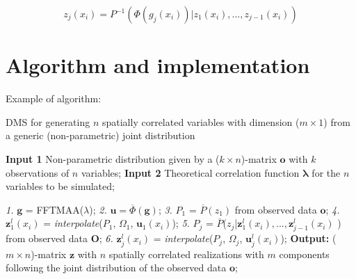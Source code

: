 \documentclass[a4paper,fleqn]{cas-sc}
\begin{document}
\begin{equation} 
\label{eqn:sampling_from_inverse_cumulative_2}
    z_j(x_i) = P^{-1}( \Phi( g_j(x_i) )|z_1(x_i),...,z_{j-1}(x_i))
\end{equation}

\section{Algorithm and implementation}

Example of algorithm:
\begin{algorithm}
  \caption{DMS for generating $n$ spatially correlated variables with dimension ($m\times1$) from a generic (non-parametric) joint distribution }
  
  \begin{algorithmic}
  \label{alg:integrado}
  \State \textbf{Input 1} Non-parametric distribution given by a ($k \times n$)-matrix $\boldsymbol{o}$ with $k$ observations of $n$ variables;
  \State \textbf{Input 2} Theoretical correlation function $\boldsymbol{\lambda}$ for the $n$ variables to be simulated;
  \newline
  
 
 \Statex \textit{1.} $\boldsymbol{g}$ = FFTMAA($\lambda$); 
  \Statex \textit{2.} $\boldsymbol{u} = \overline{\Phi}(\boldsymbol{g})$;
 \State \textit{3.}  $P_1$ = $\overline{P}(z_{1})$ from observed data $\boldsymbol{o}$;
  \newline
   \State \textit{4.} $\boldsymbol{z}_{1}^l(x_i)$ = \textit{interpolate}($P_1$, $\Omega_1$, $\boldsymbol{u}_{1}(x_i)$);
   \State \textit{5.}  $P_j$ = $\overline{P}$($z_j$|$\boldsymbol{z}_{1}^{l}(x_i),...,\boldsymbol{z}_{j-1}^{l}(x_i)$ ) from observed data $\boldsymbol{O}$; 
   \State \textit{6.} $\boldsymbol{z}_{j}^{l}(x_i)$ = \textit{interpolate}($P_j$, $\Omega_j$, $\boldsymbol{u}_{j}^l(x_i)$); 
  \EndFor
  \EndFor 
  \newline
\State  \textbf{Output:} ($m \times n$)-matrix $\boldsymbol{z}$ with $n$ spatially correlated realizations with $m$ components following the joint distribution of the observed data $\boldsymbol{o}$;
  \end{algorithmic} 
\end{algorithm} 
\end{document}
